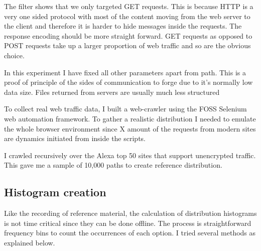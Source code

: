 \documentclass[10pt,a4paper]{article}
\begin{document}
The filter shows that we only targeted GET requests. This is because HTTP is a very one sided protocol with most of the content moving from the web server to the client and therefore it is harder to hide messages inside the requests. The response encoding should be more straight forward. GET requests as opposed to POST requests take up a larger proportion of web traffic and so are the obvious choice. 

In this experiment I have fixed all other parameters apart from path. This is a proof of principle
of the sides of communication to forge due to it's normally low data size. Files returned from servers are usually much less structured 

To collect real web traffic data, I built a web-crawler using the FOSS Selenium web automation framework. To gather a realistic distribution I needed to emulate the whole browser environment since X amount of the requests from modern sites are dynamics initiated from inside the scripts.

I crawled recursively over the Alexa top 50 sites\cite{alexa} that support unencrypted traffic. This gave me a sample of 10,000 paths to create reference distribution.

\subsection{Histogram creation}

Like the recording of reference material, the calculation of distribution histograms is not time critical since they can be done offline. The process is straightforward frequency bins to count the occurrences of each option. I tried several methods as explained below.
\end{document}
